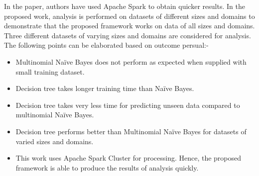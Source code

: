 \documentclass[conference]{IEEEtran}
\begin{document}
{\begin{itemize}
\end{itemize}	
In the paper\cite{b9}, authors have used Apache Spark to obtain quicker results. In the proposed work, analysis is performed on datasets of different sizes and domains to demonstrate that the proposed framework works on data of all sizes and domains. Three different datasets of varying sizes and domains are considered for analysis.\\
The following points can be elaborated based on outcome persual:-
\begin{itemize}
	\item Multinomial Naïve Bayes does not perform as expected when supplied with small training dataset.
	\item Decision tree takes longer training time than Naïve Bayes.
	\item Decision tree takes very less time for predicting unseen data compared to multinomial Naïve Bayes.
	\item Decision tree performs better than Multinomial Naïve Bayes for datasets of varied sizes and domains.
	\item This work uses Apache Spark Cluster for processing. Hence, the proposed framework is able to produce the results of analysis quickly.
\end{itemize}

}
\end{document}
